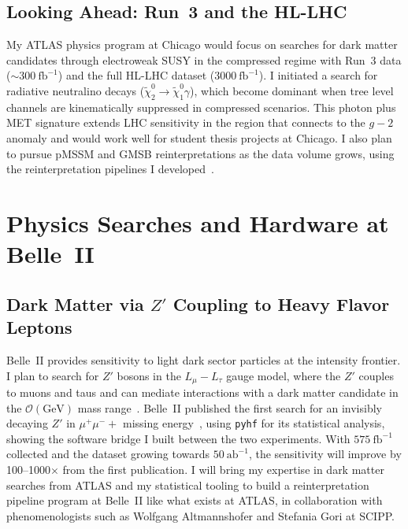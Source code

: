 \documentclass[10pt,a4paper,sans]{moderncv} %
\begin{document}
\subsection{Looking Ahead: Run~3 and the HL-LHC}
My ATLAS physics program at Chicago would focus on searches for dark matter candidates through electroweak SUSY in the compressed regime with Run~3 data ($\sim 300\ \mathrm{fb}^{-1}$) and the full HL-LHC dataset ($3000\ \mathrm{fb}^{-1}$). I initiated a search for radiative neutralino decays ($\tilde{\chi}_2^0 \to \tilde{\chi}_1^0 \gamma$), which become dominant when tree level channels are kinematically suppressed in compressed scenarios. This photon plus MET signature extends LHC sensitivity in the region that connects to the $g-2$ anomaly and would work well for student thesis projects at Chicago. I also plan to pursue pMSSM and GMSB reinterpretations as the data volume grows, using the reinterpretation pipelines I developed~\cite{10.21468/SciPostPhysCodeb.27}.

\section{Physics Searches and Hardware at Belle~II}

\subsection{Dark Matter via $Z'$ Coupling to Heavy Flavor Leptons}
Belle~II provides sensitivity to light dark sector particles at the intensity frontier. I plan to search for $Z'$ bosons in the $L_\mu - L_\tau$ gauge model, where the $Z'$ couples to muons and taus and can mediate interactions with a dark matter candidate in the $\mathcal{O}(\mathrm{GeV})$ mass range~\cite{Altmannshofer:2016jzy}. Belle~II published the first search for an invisibly decaying $Z'$ in $\mu^+\mu^- +$ missing energy~\cite{Belle-II:2019qfb}, using \texttt{pyhf} for its statistical analysis, showing the software bridge I built between the two experiments. With $575\ \mathrm{fb}^{-1}$ collected and the dataset growing towards $50\ \mathrm{ab}^{-1}$, the sensitivity will improve by 100--1000$\times$ from the first publication. I will bring my expertise in dark matter searches from ATLAS and my statistical tooling to build a reinterpretation pipeline program at Belle~II like what exists at ATLAS, in collaboration with phenomenologists such as Wolfgang Altmannshofer and Stefania Gori at SCIPP.
\end{document}
